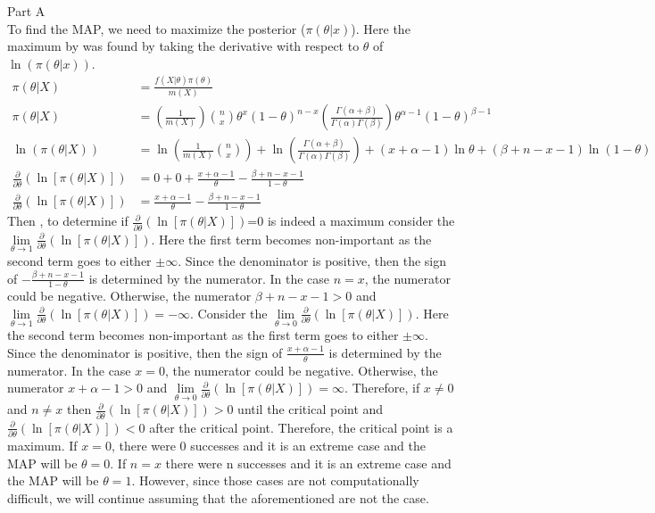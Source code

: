 \documentclass[11pt]{article}
\begin{document}
\item %
Part A \\
To find the MAP, we need to maximize the posterior ($\pi(\theta|x)$). Here the maximum by was found by taking the derivative with respect to $\theta$ of $\ln (\pi(\theta|x))$.  
\begin{align*}
\pi(\theta|X) &=\frac{ f(X| \theta) \pi (\theta)}{m(X)} \\
\pi(\theta|X) &=\left(\frac{1}{m(X)} \right)  {n \choose x} \theta^{x} (1-\theta)^{n-x} \left( \frac{\Gamma (\alpha + \beta)}{\Gamma(\alpha)\Gamma(\beta)} \right) \theta^{\alpha-1}(1-\theta)^{\beta-1} \\
\ln (\pi(\theta|X)) &= \ln \left(\frac{1}{m(X)}{n \choose x} \right)+\ln \left( \frac{\Gamma (\alpha + \beta)}{\Gamma(\alpha)\Gamma(\beta)} \right) +(x+\alpha-1) \ln \theta +(\beta+n-x-1) \ln(1-\theta) \\
\frac{\partial}{\partial \theta} \left( \ln [\pi(\theta|X)] \right) &= 0+0+\frac{x+\alpha-1}{\theta}-\frac{\beta+n-x-1}{1-\theta} \\
\frac{\partial}{\partial \theta} \left( \ln [\pi(\theta|X)] \right) &=\frac{x+\alpha-1}{\theta}-\frac{\beta+n-x-1}{1-\theta}
\end{align*}
Then , to determine if $\frac{\partial}{\partial \theta} \left( \ln [\pi(\theta|X)] \right)$=0 is indeed a maximum consider the $\lim \limits_{\theta \to 1} \frac{\partial}{\partial \theta} \left( \ln [\pi(\theta|X)] \right)$.  Here the first term becomes non-important as the second term goes to either $\pm \infty$.  Since the denominator is positive, then the sign of $-\frac{\beta+n-x-1}{1-\theta}$ is determined by the numerator. In the case $n=x$, the numerator could be negative.  Otherwise, the numerator $\beta+n-x-1>0$ and $\lim \limits_{\theta \to 1} \frac{\partial}{\partial \theta} \left( \ln [\pi(\theta|X)] \right)=-\infty$.  Consider the $\lim \limits_{\theta \to 0} \frac{\partial}{\partial \theta} \left( \ln [\pi(\theta|X)] \right)$.  Here the second term becomes non-important as the first term goes to either $\pm \infty$.  Since the denominator is positive, then the sign of $\frac{x+\alpha-1}{\theta}$ is determined by the numerator. In the case $x=0$, the numerator could be negative.  Otherwise, the numerator $x+\alpha-1>0$ and $\lim \limits_{\theta \to 0} \frac{\partial}{\partial \theta} \left( \ln [\pi(\theta|X)] \right)=\infty$.  Therefore, if $x \neq 0$ and $n \neq x$ then $\frac{\partial}{\partial \theta} \left( \ln [\pi(\theta|X)] \right)>0$ until the critical point and $\frac{\partial}{\partial \theta} \left( \ln [\pi(\theta|X)] \right)<0$ after the critical point.  Therefore, the critical point is a maximum.  If $x=0$, there were 0 successes and it is an extreme case and the MAP will be $\theta=0$.  If $n=x$ there were n successes and it is an extreme case and the MAP will be $\theta=1$.  However, since those cases are not computationally difficult, we will continue assuming that the aforementioned are not the case.
\end{document}
